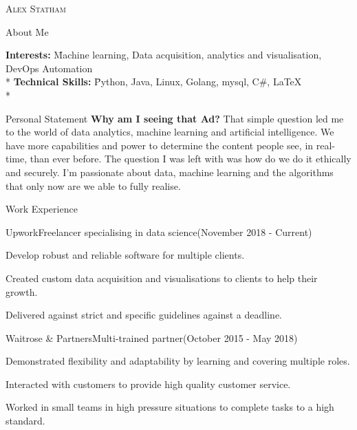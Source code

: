 \documentclass[]{article}
\newlength{\tabin}
\newlength{\secsep}
\newcommand{\lineunder}{\vspace*{-8pt} \\ \hspace*{-6pt} \hrulefill \\ \vspace*{-15pt}}
\newcommand{\name}[1]{\begin{center}\textsc{\Huge#1}\\\end{center}}
\newcommand{\contact}[1]{\begin{center}\color{contactgray}{\small#1}\end{center}}
\newenvironment{tabbedsection}[1]{
  \begin{list}{}{
      \setlength{\itemsep}{0pt}
      \setlength{\labelsep}{0pt}
      \setlength{\labelwidth}{0pt}
      \setlength{\leftmargin}{\tabin}
      \setlength{\rightmargin}{\tabin}
      \setlength{\listparindent}{0pt}
      \setlength{\parsep}{0pt}
      \setlength{\parskip}{0pt}
      \setlength{\partopsep}{0pt}
      \setlength{\topsep}{#1}
    }
  \item[]
}{\end{list}}
\newenvironment{nospacetabbing}{
    \begin{tabbing}
}{\end{tabbing}\vspace{-1.2em}}
\newenvironment{resume_header}{}{\vspace{0pt}}
\newenvironment{resume_section}[1]{
  \filbreak
  \vspace{2\secsep}
  \textsc{\large#1}
  \lineunder
  \begin{tabbedsection}{\secsep}
}{\end{tabbedsection}}
\newenvironment{subitems}{
  \renewcommand{\labelitemi}{-}
  \begin{itemize}
      \setlength{\labelsep}{1em}
}{\end{itemize}}
\newenvironment{resume_employer}[4]{
  \vspace{\secsep}
  \textbf{#1} \\ 
  \indent {\small #2} \hfill {\footnotesize#3 (#4)}
  \begin{tabbedsection}{0pt}
  \begin{subitems}
}{\end{subitems}\end{tabbedsection}}
\begin{document}
\begin{resume_header}
\name{Alex Statham}
\contact{alex.staham1998@gmail.com  $\bullet$ +447490973388 }
\end{resume_header}

\begin{resume_section}{About Me}
  \begin{nospacetabbing}
  \textbf{Interests:}  \= Machine learning,  Data acquisition, analytics and visualisation, DevOps Automation \\*
  \textbf{Technical Skills:}  \= Python, Java, Linux, Golang, mysql, C\#,  \LaTeX\\*
  \end{nospacetabbing}
\end{resume_section}

\begin{resume_section}{Personal Statement}
  \textbf{Why am I seeing that Ad?} That simple question led me to the world of data analytics, machine learning and artificial intelligence. We have more capabilities and power to determine the content people see, in real-time, than ever before. The question I was left with was how do we do it ethically and securely. I'm passionate about data, machine learning and the algorithms that only now are we able to fully realise.
\end{resume_section}

\begin{resume_section}{Work Experience}
  \begin{resume_employer}{Upwork}{Freelancer specialising in data science}{(November 2018 - Current)}{}
    \item Develop robust and reliable software for multiple clients.
    \item Created custom data acquisition and  visualisations to clients to help their growth.
    \item Delivered against strict and specific guidelines against a deadline.
  \end{resume_employer}
  
  \begin{resume_employer}{Waitrose \& Partners}{Multi-trained partner}{(October 2015 - May 2018)}{}
    \item Demonstrated flexibility and adaptability by learning and covering multiple roles.
    \item Interacted with customers to provide high quality customer service.
    \item Worked in small teams in high pressure situations to complete tasks to a high standard.
  \end{resume_employer}
\end{resume_section}
\end{document}
